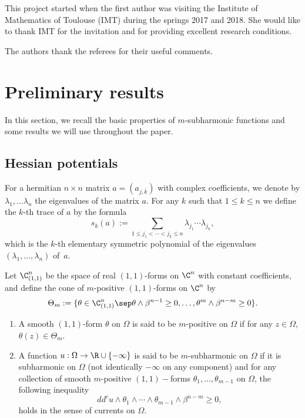 This project started when the first author was visiting the Institute of Mathematics of Toulouse (IMT) during the springs 2017 and 2018. She would like to thank IMT for the invitation and for providing excellent research conditions.

The authors thank the referees for their useful comments.

\section{Preliminary results}\label{sec:2}
In this section, we recall the basic properties of $m$-subharmonic functions and some results we will use throughout the paper.

\subsection{Hessian potentials}
For a hermitian $n \times n$ matrix $a = (a_{j,\bar k})$ with complex coefficients, we denote by $\lambda_1,\dots \lambda_n$ the eigenvalues of the matrix $a$. For any $k$ such that $1 \leq k \leq n$ we define the $k$-th trace of $a$ by the formula
\[
s_k (a):= \sum_{1 \leq j_1 < \cdots < j_k \leq n} \lambda_{j_1} \cdots \lambda_{j_k},
\]
which is the $k$-th elementary symmetric polynomial of the eigenvalues $(\lambda_1,\dots, \lambda_n)$ of~$a$.

Let $\C^n_{(1,1)} $ be the space of real $(1, 1)$-forms on $\C^n$ with constant
coefficients, and define the cone of $m$-positive $(1,1)$-forms on $\C^n$ by
\begin{equation}\label{eq:mpositive}
\Theta_m:= \{\theta \in \C^n_{(1,1)} \sep \theta \wedge \beta^{n - 1} \geq 0,\dots, \theta^m \wedge \beta^{n - m} \geq 0\}.
\end{equation}

\skpt
\begin{definition} \label{def:mpositive}
\begin{enumerate}
\item
A smooth $(1,1)$-form $\theta$ on $\Omega$ is said to be $m$-positive on $\Omega$ if for any $z \in \Omega$, $\theta (z) \in \Theta_m$.

\item
A function $u:\Omega \to \R\cup\{-\infty\}$ is said to be $m$-subharmonic on $\Omega$ if it is subharmonic on $\Omega$ (not identically $-\infty$ on any component) and for any collection of smooth $m$-positive $(1,1)-$forms $\theta_1,\dots,\theta_{m-1}$ on $\Omega$, the following inequality
\[
dd^c u\wedge \theta_1\wedge\cdots\wedge\theta_{m-1} \wedge \beta^{n-m}\geq 0,
\]
holds in the sense of currents on $\Omega$.
\end{enumerate}
\end{definition}

